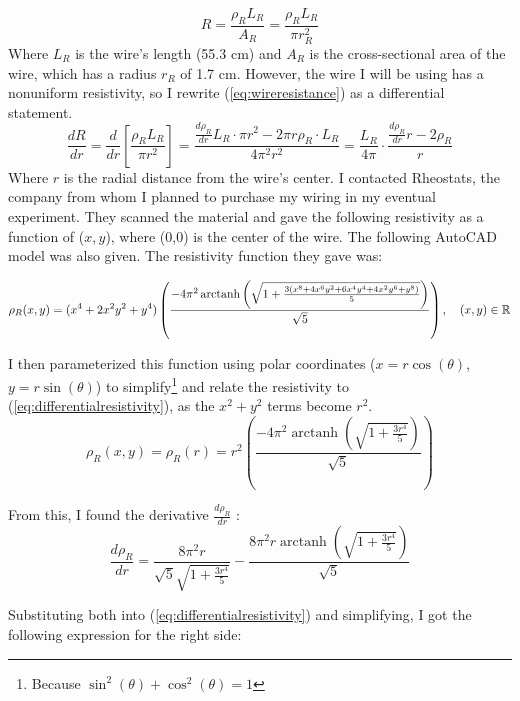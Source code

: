 \documentclass[12pt]{article}
\numberwithin{equation}{section}
\DeclareMathOperator\arctanh{arctanh}
\begin{document}
\begin{equation}\label{eq:wireresistance}
    R = \frac{\rho_R L_R}{A_R}  = \frac{\rho_R L_R}{\pi r_R^2}
\end{equation}
\noindent Where $L_R$ is the wire's length (55.3 cm) and $A_R$ is the cross-sectional area of the wire, which has a radius $r_R$ of 1.7 cm. However, the wire I will be using has a nonuniform resistivity, so I rewrite (\ref{eq:wireresistance}) as a differential statement.
\begin{equation}\label{eq:differentialresistivity}
    \frac {dR}{dr} = \frac{d}{dr} \left[ \frac{\rho_R L_R}{\pi r^2} \right] = \frac{\frac{d\rho_R}{dr} L_R \cdot \pi r^2 - 2\pi r \rho_R \cdot L_R}{4\pi^2 r^2} = \frac{L_R}{4\pi} \cdot \frac{\frac{d\rho_R}{dr} r - 2 \rho_R }{r}
\end{equation}
\noindent Where $r$ is the radial distance from the wire's center. I contacted Rheostats, the company from whom I planned to purchase my wiring in my eventual experiment. They scanned the material and gave the following resistivity as a function of ($x,y$), where (0,0) is the center of the wire. The following AutoCAD model was also given. The resistivity function they gave was:

\begin{equation}{\label{eq: resistivityfunc}}
    \rho_R (x,y) = (x^4 +2x^2y^2 +y^4) \left( \frac{-4 \pi^2 \arctanh{\left(\sqrt{1 + \frac{3 (x^8 + 4x^6y^2 + 6x^4y^4 + 4x^2y^6 + y^8)}{5}}\right)}}{\sqrt{5}} \right) , \hspace{10pt} (x,y) \in \mathbb{R}
\end{equation}

\noindent I then parameterized this function using polar coordinates ($x = r\cos(\theta)$, $y = r\sin(\theta)$) to simplify\footnote{Because $\sin^2(\theta) + \cos^2(\theta) = 1$}  and relate the resistivity to (\ref{eq:differentialresistivity}), as the $x^2 + y^2$ terms become $r^2$.
$$ \rho_R (x,y) = \rho_R(r) = r^2 \left( \frac{-4 \pi^2 \arctanh{\left(\sqrt{1 + \frac{3 r^4}{5}}\right)}}{\sqrt{5}} \right) $$

\noindent From this, I found the derivative $\frac{d\rho_R}{dr}$ :
$$
\frac{d\rho_R}{dr} = \frac{8 \pi^2 r}{\sqrt{5} \sqrt{1 + \frac{3 r^4}{5}}} - \frac{8 \pi^2 r \arctanh{\left(\sqrt{1 + \frac{3 r^4}{5}}\right)}}{\sqrt{5}}
$$

\noindent Substituting both into (\ref{eq:differentialresistivity}) and simplifying, I got the following expression for the right side:
\end{document}
